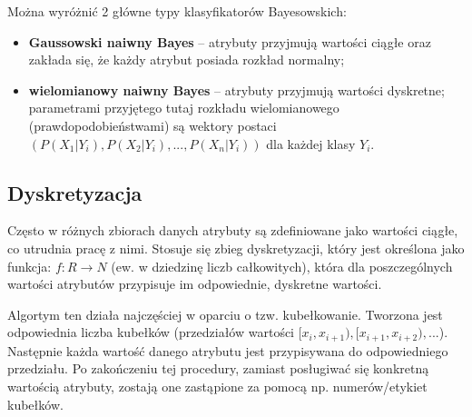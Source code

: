         \noindent Można wyróżnić 2 główne typy klasyfikatorów Bayesowskich:
        \begin{itemize}
            \item{\textbf{Gaussowski naiwny Bayes} -- atrybuty przyjmują wartości ciągłe oraz zakłada się, że każdy atrybut
                  posiada rozkład normalny;}
            \item{\textbf{wielomianowy naiwny Bayes} -- atrybuty przyjmują wartości dyskretne; parametrami
                  przyjętego tutaj rozkładu wielomianowego (prawdopodobieństwami) są wektory postaci
                  $(P(X_1|Y_i), P(X_2|Y_i), ..., P(X_n|Y_i))$ dla każdej klasy $Y_i$.}
        \end{itemize}

    \pagebreak
    \subsection{Dyskretyzacja}
        Często w różnych zbiorach danych atrybuty są zdefiniowane jako wartości ciągłe, co utrudnia
        pracę z nimi. Stosuje się zbieg dyskretyzacji, który jest określona jako funkcja: $f: R \to N$
        (ew. w dziedzinę liczb całkowitych), która dla poszczególnych wartości atrybutów przypisuje im
        odpowiednie, dyskretne wartości.
        \vspace{1em}

        \noindent
        Algortym ten działa najczęściej w oparciu o tzw. kubełkowanie. Tworzona jest odpowiednia liczba
        kubełków (przedziałów wartości $[x_i, x_{i+1}), [x_{i+1}, x_{i+2}), ...$). Następnie każda wartość
        danego atrybutu jest przypisywana do odpowiedniego przedziału. Po zakończeniu tej procedury, zamiast
        posługiwać się konkretną wartością atrybuty, zostają one zastąpione za pomocą np. numerów/etykiet kubełków.
        \vspace{1em}

